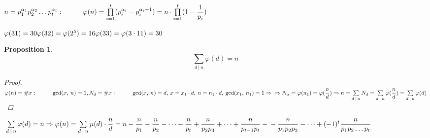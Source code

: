 \documentclass[a4paper,12pt, centered]{bookest}
\newtheorem*{prop*}{Proposition}
\newcommand\tab[1][1cm]{\hspace*{#1}}
\begin{document}
$n=p^{\alpha_1}_1p^{\alpha_2}_2\dots p^{\alpha_t}_t:\tab \varphi(n)=\prod\limits_{i=1}^{t}(p^{\alpha_i}_i-p^{\alpha_i-1}_i)=n\cdot\prod\limits_{i=1}^{t}(1-\dfrac{1}{p_i})$
\begin{example}
$\varphi(31)=30\\\varphi(32)=\varphi(2^5)=16\\\varphi(33)=\varphi(3\cdot 11)=30$	
\end{example}
\begin{prop*}
$$\sum\limits_{d\>|\>n}\varphi(d)=n$$
\begin{proof}
	$\\\varphi(n)=\# x:\tab\gcd(x,\>n)=1,\\ N_d=\# x:\tab\gcd(x,\>n)=d,\>x=x_1\cdot d,\>n=n_1\cdot d,\>\gcd(x_1,\>n_1)=1\Rightarrow\\\Rightarrow N_\alpha=\varphi(n_1)=\varphi(\dfrac nd)\Rightarrow n=\sum\limits_{d\>|\>n}N_d=\sum\limits_{d\>|\>n}\varphi(\dfrac nd)=\sum\limits_{d\>|\>n}\varphi(d)$
\end{proof}	
\end{prop*}
$\\\sum\limits_{d\>|\>n}\varphi(d)=n\Rightarrow\varphi(n)=\sum\limits_{d\>|\>n}\mu(d)\cdot\dfrac nd=n-\dfrac n{p_1}-\dfrac n{p_2}-\dots-\dfrac n{p_t}+\dfrac n{p_2p_3}+\dots+\dfrac n{p_{t-1}p_t}-\\-\dfrac n{p_1p_2p_2}-\dots+(-1)^t\dfrac n{p_1p_2\dots p_t}$
\end{document}

